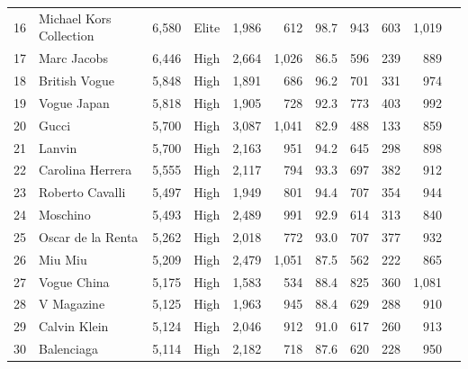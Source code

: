 \begin{table}[htbp]
\begin{tabular}{rlrllrrrrrr}
16 & Michael Kors Collection & 6,580 & Elite & 1,986 & 612 & 98.7 & 943 & 603 & 1,019 \\
17 & Marc Jacobs & 6,446 & High & 2,664 & 1,026 & 86.5 & 596 & 239 & 889 \\
18 & British Vogue & 5,848 & High & 1,891 & 686 & 96.2 & 701 & 331 & 974 \\
19 & Vogue Japan & 5,818 & High & 1,905 & 728 & 92.3 & 773 & 403 & 992 \\
20 & Gucci & 5,700 & High & 3,087 & 1,041 & 82.9 & 488 & 133 & 859 \\
21 & Lanvin & 5,700 & High & 2,163 & 951 & 94.2 & 645 & 298 & 898 \\
22 & Carolina Herrera & 5,555 & High & 2,117 & 794 & 93.3 & 697 & 382 & 912 \\
23 & Roberto Cavalli & 5,497 & High & 1,949 & 801 & 94.4 & 707 & 354 & 944 \\
24 & Moschino & 5,493 & High & 2,489 & 991 & 92.9 & 614 & 313 & 840 \\
25 & Oscar de la Renta & 5,262 & High & 2,018 & 772 & 93.0 & 707 & 377 & 932 \\
26 & Miu Miu & 5,209 & High & 2,479 & 1,051 & 87.5 & 562 & 222 & 865 \\
27 & Vogue China & 5,175 & High & 1,583 & 534 & 88.4 & 825 & 360 & 1,081 \\
28 & V Magazine & 5,125 & High & 1,963 & 945 & 88.4 & 629 & 288 & 910 \\
29 & Calvin Klein & 5,124 & High & 2,046 & 912 & 91.0 & 617 & 260 & 913 \\
30 & Balenciaga & 5,114 & High & 2,182 & 718 & 87.6 & 620 & 228 & 950 \\
\bottomrule
\end{tabular}
\end{table}